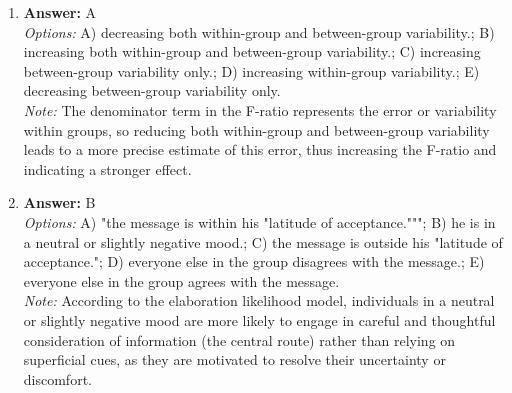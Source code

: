 \documentclass[12pt]{article}
\begin{document}
\begin{enumerate}[label=\arabic*.]
\item \textbf{Answer:} A
\\ \textit{Options:} A) decreasing both within-group and between-group variability.; B) increasing both within-group and between-group variability.; C) increasing between-group variability only.; D) increasing within-group variability.; E) decreasing between-group variability only.
\\ \textit{Note:} The denominator term in the F-ratio represents the error or variability within groups, so reducing both within-group and between-group variability leads to a more precise estimate of this error, thus increasing the F-ratio and indicating a stronger effect.
\item \textbf{Answer:} B
\\ \textit{Options:} A) "the message is within his "latitude of acceptance."""; B) he is in a neutral or slightly negative mood.; C) the message is outside his "latitude of acceptance."; D) everyone else in the group disagrees with the message.; E) everyone else in the group agrees with the message.
\\ \textit{Note:} According to the elaboration likelihood model, individuals in a neutral or slightly negative mood are more likely to engage in careful and thoughtful consideration of information (the central route) rather than relying on superficial cues, as they are motivated to resolve their uncertainty or discomfort.
\end{enumerate}
\end{document}
